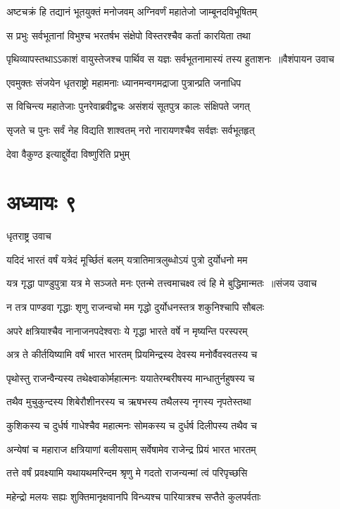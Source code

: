 \twolineshloka
{अष्टचक्रं हि तद्यानं भूतयुक्तं मनोजवम्}
{अग्निवर्णं महातेजो जाम्बूनदविभूषितम्}


\twolineshloka
{स प्रभुः सर्वभूतानां विभुश्च भरतर्षभ}
{संक्षेपो विस्तरश्चैव कर्ता कारयिता तथा}


\threelineshloka
{पृथिव्यापस्तथाऽऽकाशं वायुस्तेजश्च पार्थिव}
{स यज्ञः सर्वभूतनामास्यं तस्य हुताशनः ॥वैशंपायन उवाच}
{}


\twolineshloka
{एवमुक्तः संजयेन धृतराष्ट्रो महामनाः}
{ध्यानमन्वगमद्राजा पुत्रान्प्रति जनाधिप}


\twolineshloka
{स विचिन्त्य महातेजाः पुनरेवाब्रवीद्वचः}
{असंशयं सूतपुत्र कालः संक्षिपते जगत्}


\twolineshloka
{सृजते च पुनः सर्वं नेह विद्यति शाश्वतम्}
{नरो नारायणश्चैव सर्वज्ञः सर्वभूतहृत्}


देवा वैकुण्ठ इत्याद्दुर्वेदा विष्णुरिति प्रभुम्
\chapter{अध्यायः ९}
\twolineshloka
{धृतराष्ट्र उवाच}
{}


\twolineshloka
{यदिदं भारतं वर्षं यत्रेदं मूर्च्छितं बलम्}
{यत्रातिमात्रलुब्धोऽयं पुत्रो दुर्योधनो मम}


\threelineshloka
{यत्र गृद्धा पाण्डुपुत्रा यत्र मे सञ्जते मनः}
{एतन्मे तत्त्वमाचक्ष्व त्वं हि मे बुद्धिमान्मतः ॥संजय उवाच}
{}


\twolineshloka
{न तत्र पाण्डवा गृद्धाः शृणु राजन्वचो मम}
{गृद्धो दुर्योधनस्तत्र शकुनिश्चापि सौबलः}


\twolineshloka
{अपरे क्षत्रियाश्चैव नानाजनपदेश्वराः}
{ये गृद्धा भारते वर्षे न मृष्यन्ति परस्परम्}


\twolineshloka
{अत्र ते कीर्तयिष्यामि वर्षं भारत भारतम्}
{प्रियमिन्द्रस्य देवस्य मनोर्वैवस्वतस्य च}


\twolineshloka
{पृथोस्तु राजन्वैन्यस्य तथेक्ष्वाकोर्महात्मनः}
{ययातेरम्बरीषस्य मान्धातुर्नहुषस्य च}


\twolineshloka
{तथैव मुचुकुन्दस्य शिबेरौशीनरस्य च}
{ऋषभस्य तथैलस्य नृगस्य नृपतेस्तथा}


\twolineshloka
{कुशिकस्य च दुर्धर्ष गाधेश्चैव महात्मनः}
{सोमकस्य च दुर्धर्ष दिलीपस्य तथैव च}


\twolineshloka
{अन्येषां च महाराज क्षत्रियाणां बलीयसाम्}
{सर्वेषामेव राजेन्द्र प्रियं भारत भारतम्}


\twolineshloka
{तत्ते वर्षं प्रवक्ष्यामि यथायथमरिन्दम}
{श्रृणु मे गदतो राजन्यन्मां त्वं परिपृच्छसि}


\twolineshloka
{महेन्द्रो मलयः सह्यः शुक्तिमानृक्षवानपि}
{विन्ध्यश्च पारियात्रश्च सप्तैते कुलपर्वताः}


